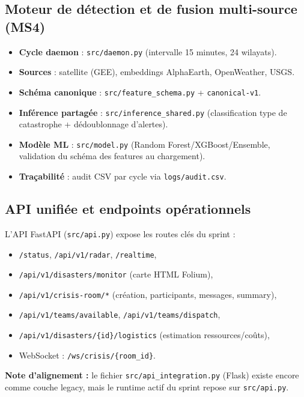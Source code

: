 \subsection{Moteur de d\'etection et de fusion multi-source (MS4)}
\begin{itemize}
    \item \textbf{Cycle daemon} : \texttt{src/daemon.py} (intervalle 15 minutes, 24 wilayats).
    \item \textbf{Sources} : satellite (GEE), embeddings AlphaEarth, OpenWeather, USGS.
    \item \textbf{Sch\'ema canonique} : \texttt{src/feature\_schema.py} + \texttt{canonical-v1}.
    \item \textbf{Inf\'erence partag\'ee} : \texttt{src/inference\_shared.py} (classification type de catastrophe + d\'edoublonnage d'alertes).
    \item \textbf{Mod\`ele ML} : \texttt{src/model.py} (Random Forest/XGBoost/Ensemble, validation du sch\'ema des features au chargement).
    \item \textbf{Tra\c{c}abilit\'e} : audit CSV par cycle via \texttt{logs/audit.csv}.
\end{itemize}

\subsection{API unifi\'ee et endpoints op\'erationnels}
L'API FastAPI (\texttt{src/api.py}) expose les routes cl\'es du sprint :
\begin{itemize}
    \item \texttt{/status}, \texttt{/api/v1/radar}, \texttt{/realtime},
    \item \texttt{/api/v1/disasters/monitor} (carte HTML Folium),
    \item \texttt{/api/v1/crisis-room/*} (cr\'eation, participants, messages, summary),
    \item \texttt{/api/v1/teams/available}, \texttt{/api/v1/teams/dispatch},
    \item \texttt{/api/v1/disasters/\{id\}/logistics} (estimation ressources/co\^uts),
    \item WebSocket : \texttt{/ws/crisis/\{room\_id\}}.
\end{itemize}

\textbf{Note d'alignement :} le fichier \texttt{src/api\_integration.py} (Flask) existe encore comme couche legacy, mais le runtime actif du sprint repose sur \texttt{src/api.py}.

